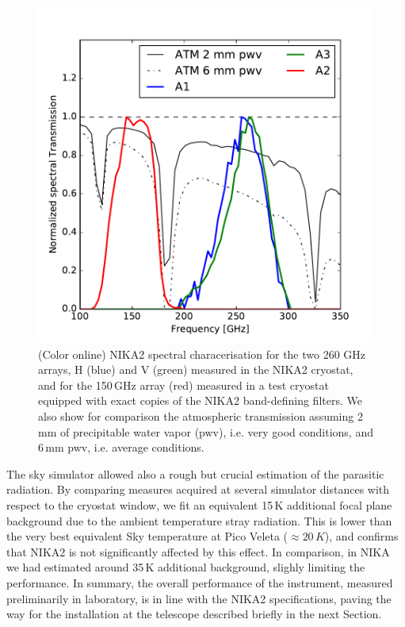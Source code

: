 \documentclass[]{aa} %
\begin{document}
\begin{figure}[h]
   \centering
    \includegraphics[width=1.0\linewidth]{atm_transmission.pdf}
      \caption{(Color online) NIKA2 spectral characerisation for the two 260 GHz arrays, H (blue) and V (green) measured in the NIKA2 cryostat, and for the 150\,GHz array (red) measured in a test cryostat equipped with exact copies of the NIKA2 band-defining filters. We also show for comparison the atmospheric transmission assuming 2\,mm of precipitable water vapor (pwv), i.e. very good conditions, and 6\,mm pwv, i.e. average conditions.
         \label{Fig4}}
\end{figure}

The sky simulator allowed also a rough but crucial estimation of the parasitic radiation. By comparing measures acquired at several simulator distances with respect to the cryostat window, we fit an equivalent 15\,K additional focal plane background due to the ambient temperature stray radiation. This is lower than the very best equivalent Sky temperature at Pico Veleta ($\approx 20\,K$), and confirms that NIKA2 is not significantly affected by this effect. In comparison, in NIKA we had estimated around 35\,K additional background, slighly limiting the performance. 
In summary, the overall performance of the instrument, measured preliminarily in laboratory, is in line with the NIKA2 specifications, paving the way for the installation at the telescope described briefly in the next Section. 
\end{document}
